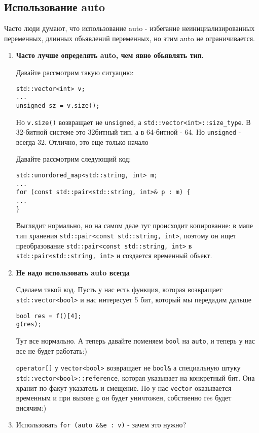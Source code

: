 	\subsection{Использование auto}
	Часто люди думают, что использование auto - избегание неинициализированных переменных, длинных обьявлений переменных, но этим auto не ограничивается.
	\begin{enumerate}
		\item \textbf{Часто лучше определять auto, чем явно обьявлять тип.}
	
		Давайте рассмотрим такую ситуацию:
\begin{verbatim}
std::vector<int> v;
...
unsigned sz = v.size();
\end{verbatim}
		Но \texttt{v.size()} возвращает не \texttt{unsigned}, а \texttt{std::vector<int>::size_type}. В 32-битной системе это 32битный тип, а в 64-битной - 64. Но \texttt{unsigned} - всегда 32.
		Отлично, это еще только начало
		
		Давайте рассмотрим следующий код:
\begin{verbatim}
std::unordored_map<std::string, int> m;
...
for (const std::pair<std::string, int>& p : m) {
...
}
\end{verbatim}
		Выглядит нормально, но на самом деле тут происходит копирование: в мапе тип хранения \texttt{std::pair<const std::string, int>}, поэтому он ищет преобразование \texttt{std::pair<const std::string, int>} в \texttt{std::pair<std::string, int>} и создается временный обьект.
		
	    \item \textbf{Не надо использовать auto всегда}
	    
		Сделаем такой код. Пусть у нас есть функция, которая возвращает \texttt{std::vector<bool>} и нас интересует 5 бит, который мы передадим дальше
\begin{verbatim}
bool res = f()[4];
g(res);
\end{verbatim}
		Тут все нормально. А теперь давайте поменяем \texttt{bool} на \texttt{auto}, и теперь у нас все не будет работать:)
		
		\texttt{operator[]} у \texttt{vector<bool>} возвращает не \texttt{bool&} а специальную штуку \texttt{std::vector<bool>::reference}, которая указывает на конкретный бит. Она хранит по факут указатель и смещение. Но у нас \texttt{vector} оказывается временным и при вызове g он будет уничтожен, собственно res будет висячим:)
		\item Использовать \texttt{for (auto &&e : v)} - зачем это нужно?
	\end{enumerate}

